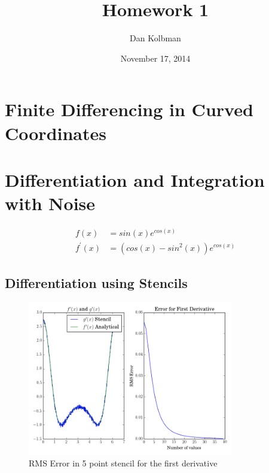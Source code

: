 \documentclass[12pt]{article}
\title{Homework 1}
\author{Dan Kolbman}
\date{November 17, 2014}
\begin{document}
  
  \maketitle

 
  \section{Finite Differencing in Curved Coordinates}

  \section{Differentiation and Integration with Noise}


  \begin{align}
    f(x) &= sin(x)e^{cos(x)} \\
    f^{\prime}(x) &= (cos(x)-sin^2(x))e^{cos(x)}
  \end{align}

  \subsection{Differentiation using Stencils}
  \begin{figure}[h!]
    \centering
    \includegraphics[width=0.8\textwidth]{Problem2ia.png}
    \caption{RMS Error in 5 point stencil for the first derivative}
  \end{figure}
\end{document}
